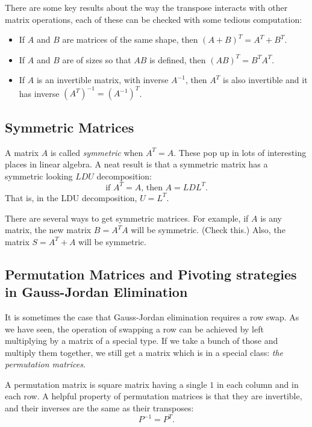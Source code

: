 \documentclass[11pt]{amsart}
\theoremstyle{definition}
\begin{document}
There are some key results about the way the transpose interacts with other matrix operations, each of these can be checked with some tedious computation:
\begin{itemize}
\item If $A$ and $B$ are matrices of the same shape, then $(A+B)^T = A^T + B^T$.

\item If $A$ and $B$ are of sizes so that $AB$ is defined, then $(AB)^T = B^T A^T$.

\item If $A$ is an invertible matrix, with inverse $A^{-1}$, then $A^T$ is also invertible and it has inverse $\left(A^T\right)^{-1} = \left(A^{-1}\right)^T $.

\end{itemize}

\subsection{Symmetric Matrices}

A matrix $A$ is called \emph{symmetric} when $A^T = A$. These pop up in lots of interesting places in linear algebra. A neat result is that a symmetric matrix has a symmetric looking $LDU$ decomposition:
\[
\text{if } A^T=A\text{, then } A = LDL^T .
\]
That is, in the LDU decomposition, $U = L^T$.

There are several ways to get symmetric matrices. For example, if $A$ is any matrix, the new matrix $B = A^T A$ will be symmetric. (Check this.) Also, the matrix $S = A^T + A$ will be symmetric.

\subsection{Permutation Matrices and Pivoting strategies in Gauss-Jordan Elimination}

It is sometimes the case that Gauss-Jordan elimination requires a row swap. As we have seen, the operation of swapping a row can be achieved by left multiplying by a matrix of a special type. If we take a bunch of those and multiply them together, we still get a matrix which is in a special class: \emph{the permutation matrices}.

A permutation matrix is square matrix having a single $1$ in each column and in each row. A helpful property of permutation matrices is that they are invertible, and their inverses are the same as their transposes:
\[
P^{-1} = P^T .
\]
\end{document}
